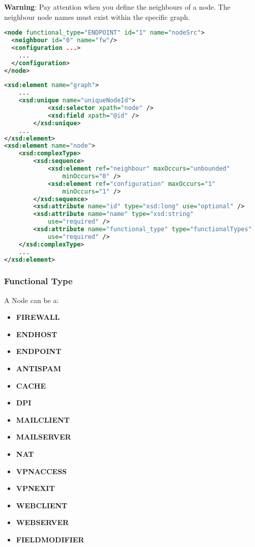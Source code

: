 \begin{warning}
\textbf{Warning}: Pay attention when you define the neighbours of a node. The neighbour node names must exist within the specific graph.
\end{warning}

\begin{lstlisting}[language=XML, caption=Node Example]
<node functional_type="ENDPOINT" id="1" name="nodeSrc">
  <neighbour id="0" name="fw"/>
  <configuration ...>
    ...
  </configuration>
</node>
\end{lstlisting}

\begin{lstlisting}[language=XML, caption=Node schema code snippet]
<xsd:element name="graph">
    ...
    <xsd:unique name="uniqueNodeId">
            <xsd:selector xpath="node" />
            <xsd:field xpath="@id" />
        </xsd:unique>
    ...
</xsd:element>
<xsd:element name="node">
    <xsd:complexType>
        <xsd:sequence>
            <xsd:element ref="neighbour" maxOccurs="unbounded"
                minOccurs="0" />
            <xsd:element ref="configuration" maxOccurs="1"
                minOccurs="1" />
        </xsd:sequence>
        <xsd:attribute name="id" type="xsd:long" use="optional" />
        <xsd:attribute name="name" type="xsd:string"
            use="required" />
        <xsd:attribute name="functional_type" type="functionalTypes"
            use="required" />
    </xsd:complexType>
    ...
</xsd:element>
\end{lstlisting}


\subsubsection*{Functional Type}

A Node can be a:
\begin{itemize}
 \item \textbf{FIREWALL}
 \item \textbf{ENDHOST}
 \item \textbf{ENDPOINT}
 \item \textbf{ANTISPAM}
 \item \textbf{CACHE}
 \item \textbf{DPI}
 \item \textbf{MAILCLIENT}
 \item \textbf{MAILSERVER}
 \item \textbf{NAT}
 \item \textbf{VPNACCESS}
 \item \textbf{VPNEXIT}
 \item \textbf{WEBCLIENT}
 \item \textbf{WEBSERVER}
 \item \textbf{FIELDMODIFIER}
\end{itemize}

